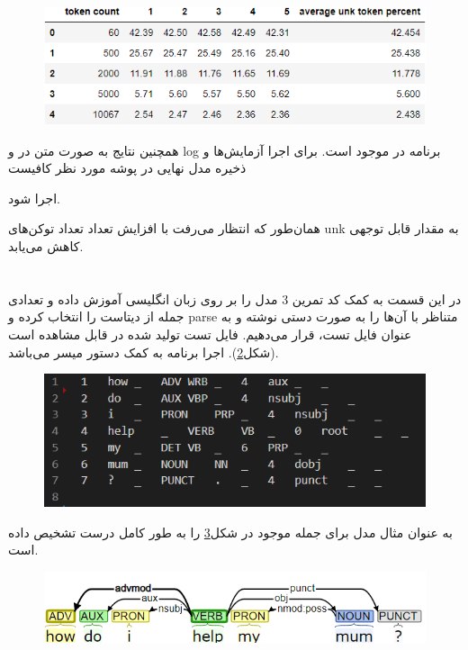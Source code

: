 \documentclass[10pt]{article}
\begin{document}
\begin{figure}[ht!]
	\centering\includegraphics[width=\linewidth]{../reports/tokenization.png}
	\caption{
		}
	\label{tok}
\end{figure}

همچنین نتایج به صورت متن در
و log برنامه در 
موجود است. برای اجرا آزمایش‌ها و ذخیره مدل نهایی در پوشه مورد نظر کافیست 


اجرا شود.

همان‌طور که انتظار می‌رفت با افزایش تعداد
تعداد توکن‌های unk به مقدار قابل توجهی کاهش می‌یابد.
\newpage

\section{
}

در این قسمت به کمک کد تمرین 3 مدل
را بر روی زبان انگلیسی آموزش داده و تعدادی جمله از دیتاست را انتخاب کرده و parse متناظر با آن‌ها را به صورت دستی نوشته و به عنوان فایل تست، قرار می‌دهیم. فایل تست تولید شده در 
قابل مشاهده است (شکل\ref{dep_parser_test}). اجرا برنامه به کمک دستور
میسر می‌باشد.
\begin{figure}[ht!]
	\centering\includegraphics[width=0.7\linewidth]{../reports/dep_parser_test.png}
	\caption{
		}
	\label{dep_parser_test}
\end{figure}

به عنوان مثال مدل برای جمله موجود در شکل\ref{dep_parser} 
را به طور کامل درست تشخیص داده است.
\begin{figure}[ht!]
	\centering\includegraphics[width=0.8\linewidth]{../reports/dep_parser_1.png}
	\caption{
		}
	\label{dep_parser}
\end{figure}
\end{document}
